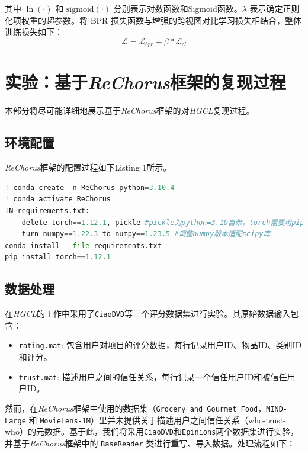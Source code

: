 \documentclass{article}
\begin{document}
其中 $\ln(\cdot)$ 和 \( \mathrm{sigmoid}(\cdot) \) 分别表示对数函数和Sigmoid函数。\( \lambda \) 表示确定正则化项权重的超参数。将 BPR 损失函数与增强的跨视图对比学习损失相结合，整体训练损失如下：
\begin{equation}
\mathcal{L} = \mathcal{L}_{bpr} + \beta * \mathcal{L}_{cl}
\end{equation}

\section{实验：基于\emph{ReChorus}框架的复现过程}

本部分将尽可能详细地展示基于\emph{ReChorus}框架的对\emph{HGCL}复现过程。

\subsection{环境配置}

\emph{ReChorus}框架的配置过程如下Listing 1所示。

\begin{lstlisting}[language=Python,caption=环境配置]
! conda create -n ReChorus python=3.10.4
! conda activate ReChorus
IN requirements.txt: 
    delete torch==1.12.1, pickle #pickle为python=3.10自带，torch需要用pip安装
    turn numpy==1.22.3 to numpy==1.23.5 #调整numpy版本适配scipy库
conda install --file requirements.txt
pip install torch==1.12.1
\end{lstlisting}

\subsection{数据处理}

在\emph{HGCL}的工作\cite{Chen_2023}中采用了\lstinline{CiaoDVD}\cite{guo2014etaf}等三个评分数据集进行实验。其原始数据输入包含：
\begin{itemize}
    \item \lstinline{rating.mat}: 包含用户对项目的评分数据，每行记录用户ID、物品ID、类别ID和评分。
    \item \lstinline{trust.mat}: 描述用户之间的信任关系，每行记录一个信任用户ID和被信任用户ID。
\end{itemize}

然而，在\emph{ReChorus}框架中使用的数据集（\lstinline{Grocery_and_Gourmet_Food}，\lstinline{MIND-Large} 和 \lstinline{MovieLens-1M}）里并未提供关于描述用户之间信任关系（who-trust-who）的元数据。基于此，我们将采用\lstinline{CiaoDVD}\cite{guo2014etaf}和\lstinline{Epinions}\cite{leskovec2016snap}两个数据集进行实验，并基于\emph{ReChorus}框架中的 \lstinline{BaseReader} 类进行重写、导入数据。处理流程如下：
\end{document}
